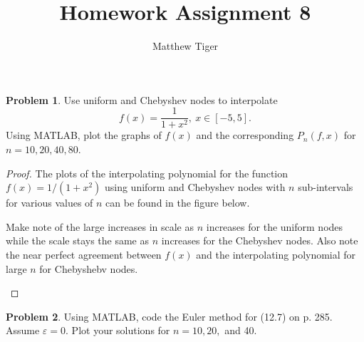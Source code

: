 \documentclass[12pt]{article}
\title{Homework Assignment 8}
\author{Matthew Tiger}
\theoremstyle{definition}
\newtheorem{problem}{Problem}
\begin{document}
\maketitle


\begin{problem}
  Use uniform and Chebyshev nodes to interpolate
  \[
    f(x) = \frac{1}{1 + x^2},\ x \in [-5, 5].
  \]
  Using MATLAB, plot the graphs of $f(x)$ and the corresponding $P_n(f, x)$ for $n=10,20,40,80$.
\end{problem}

\begin{proof}
  The plots of the interpolating polynomial for the function $f(x) = 1 / (1+ x^2)$
  using uniform and Chebyshev nodes with $n$ sub-intervals for various values of
  $n$ can be found in the figure below.

  Make note of the large increases in scale as $n$ increases for the uniform nodes
  while the scale stays the same as $n$ increases for the Chebyshev nodes.
  Also note the near perfect agreement between $f(x)$ and the interpolating polynomial for large $n$ for Chebyshebv nodes.

  \begin{center}
  \end{center}
\end{proof}


\begin{problem}
  Using MATLAB, code the Euler method for (12.7) on p. 285. Assume $\varepsilon = 0$.
  Plot your solutions for $n=10,20, $ and 40.
\end{problem}
\end{document}
